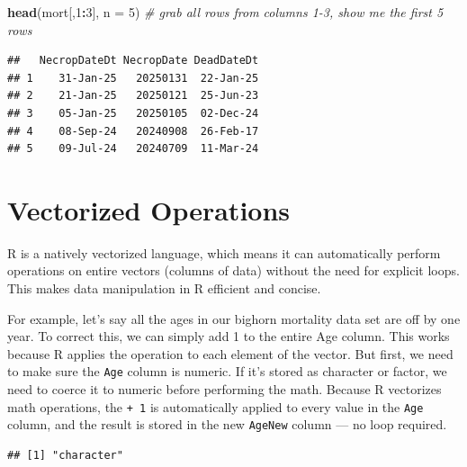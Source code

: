 \documentclass[
]{book}
\newenvironment{Shaded}{\begin{snugshade}}{\end{snugshade}}
\newcommand{\AttributeTok}[1]{\textcolor[rgb]{0.13,0.29,0.53}{#1}}
\newcommand{\CommentTok}[1]{\textcolor[rgb]{0.56,0.35,0.01}{\textit{#1}}}
\newcommand{\DecValTok}[1]{\textcolor[rgb]{0.00,0.00,0.81}{#1}}
\newcommand{\FunctionTok}[1]{\textcolor[rgb]{0.13,0.29,0.53}{\textbf{#1}}}
\newcommand{\NormalTok}[1]{#1}
\newcommand{\OtherTok}[1]{\textcolor[rgb]{0.56,0.35,0.01}{#1}}
\newcommand{\SpecialCharTok}[1]{\textcolor[rgb]{0.81,0.36,0.00}{\textbf{#1}}}
\begin{document}
\begin{Shaded}
\begin{Highlighting}[]
\FunctionTok{head}\NormalTok{(mort[,}\DecValTok{1}\SpecialCharTok{:}\DecValTok{3}\NormalTok{], }\AttributeTok{n =} \DecValTok{5}\NormalTok{) }\CommentTok{\# grab all rows from columns 1{-}3, show me the first 5 rows}
\end{Highlighting}
\end{Shaded}

\begin{verbatim}
##   NecropDateDt NecropDate DeadDateDt
## 1    31-Jan-25   20250131  22-Jan-25
## 2    21-Jan-25   20250121  25-Jun-23
## 3    05-Jan-25   20250105  02-Dec-24
## 4    08-Sep-24   20240908  26-Feb-17
## 5    09-Jul-24   20240709  11-Mar-24
\end{verbatim}

\section{Vectorized Operations}\label{vectorized}

R is a natively vectorized language, which means it can automatically perform operations on entire vectors (columns of data) without the need for explicit loops. This makes data manipulation in R efficient and concise.

For example, let's say all the ages in our bighorn mortality data set are off by one year. To correct this, we can simply add 1 to the entire Age column. This works because R applies the operation to each element of the vector. But first, we need to make sure the \texttt{Age} column is numeric. If it's stored as character or factor, we need to coerce it to numeric before performing the math. Because R vectorizes math operations, the \texttt{+\ 1} is automatically applied to every value in the \texttt{Age} column, and the result is stored in the new \texttt{AgeNew} column --- no loop required.

\begin{Shaded}
\end{Shaded}

\begin{verbatim}
## [1] "character"
\end{verbatim}

\begin{Shaded}
\end{Shaded}
\end{document}
